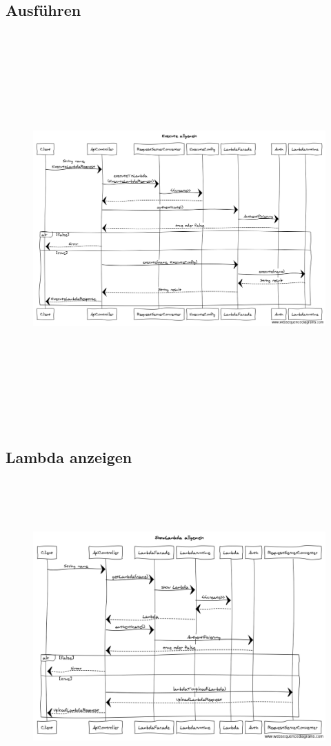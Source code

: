 \documentclass[a4paper,20pt,oneside]{book}
\begin{document}
\subsection{Ausführen}
	\begin{figure}[!hb]
    \includegraphics[width=18cm,height=15cm]{Execute}
\end{figure}
\newpage
\subsection{Lambda anzeigen}
	\begin{figure}[!hb]
    \includegraphics[width=18cm,height=12cm]{ShowLambda}
\end{figure}
\newpage
\end{document}
